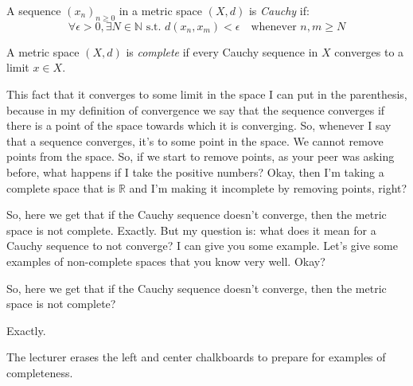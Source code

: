 \begin{math-stroke}
\begin{definition}\label{def:cauchy-sequence-v2}
A sequence $(x_n)_{n \ge 0}$ in a metric space $(X, d)$ is \emph{Cauchy} if:
\[ \forall \epsilon > 0, \exists N \in \mathbb{N} \text{ s.t. } d(x_n, x_m) < \epsilon \quad \text{whenever } n, m \ge N \]
\end{definition}

\begin{definition}\label{def:complete-space-v2}
A metric space $(X, d)$ is \emph{complete} if every Cauchy sequence in $X$ converges to a limit $x \in X$.
\end{definition}
\end{math-stroke}

\begin{spoken-clean}[00:01:25 - 00:02:26]
This fact that it converges to some limit in the space I can put in the parenthesis, because in my definition of convergence we say that the sequence converges if there is a point of the space towards which it is converging. So, whenever I say that a sequence converges, it's to some point in the space. We cannot remove points from the space. So, if we start to remove points, as your peer was asking before, what happens if I take the positive numbers? Okay, then I'm taking a complete space that is $\mathbb{R}$ and I'm making it incomplete by removing points, right?
\end{spoken-clean}

\begin{spoken-clean}[00:02:26 - 00:03:12]
So, here we get that if the Cauchy sequence doesn't converge, then the metric space is not complete. Exactly. But my question is: what does it mean for a Cauchy sequence to not converge? I can give you some example. Let's give some examples of non-complete spaces that you know very well. Okay?
\end{spoken-clean}

\begin{student-interaction}
So, here we get that if the Cauchy sequence doesn't converge, then the metric space is not complete?
\end{student-interaction}

\begin{spoken-clean}[continued]
Exactly.
\end{spoken-clean}

\begin{meta-note}[Transition]
The lecturer erases the left and center chalkboards to prepare for examples of completeness.
\end{meta-note}


